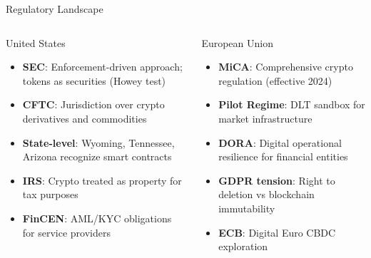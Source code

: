 \documentclass[8pt,aspectratio=169]{beamer}
\begin{document}
\begin{frame}{Regulatory Landscape}
\begin{columns}[T]
\begin{block}{\textcolor{mlblue}{United States}}
\footnotesize
\begin{itemize}
  \item \textbf{SEC}: Enforcement-driven approach; tokens as securities (Howey test)
  \item \textbf{CFTC}: Jurisdiction over crypto derivatives and commodities
  \item \textbf{State-level}: Wyoming, Tennessee, Arizona recognize smart contracts
  \item \textbf{IRS}: Crypto treated as property for tax purposes
  \item \textbf{FinCEN}: AML/KYC obligations for service providers
\end{itemize}
\end{block}

\begin{block}{\textcolor{mlgreen}{European Union}}
\footnotesize
\begin{itemize}
  \item \textbf{MiCA}: Comprehensive crypto regulation (effective 2024)
  \item \textbf{Pilot Regime}: DLT sandbox for market infrastructure
  \item \textbf{DORA}: Digital operational resilience for financial entities
  \item \textbf{GDPR tension}: Right to deletion vs blockchain immutability
  \item \textbf{ECB}: Digital Euro CBDC exploration
\end{itemize}
\end{block}


\end{columns}
\end{frame}
\end{document}
